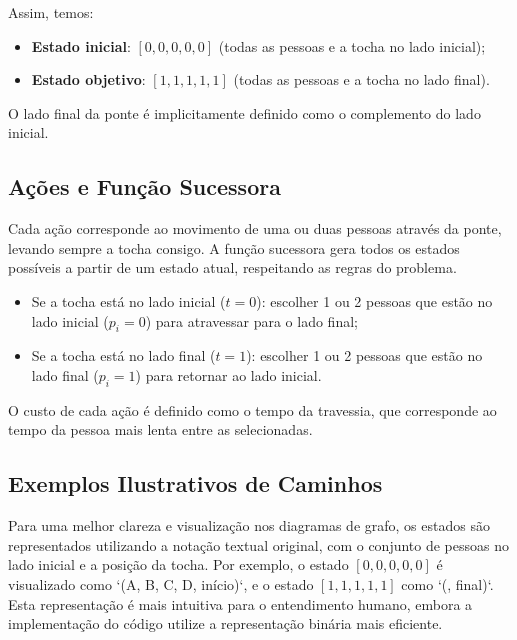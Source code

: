 \documentclass[12pt,a4paper]{article}
\begin{document}
Assim, temos:
\begin{itemize}
    \item \textbf{Estado inicial}: $[0, 0, 0, 0, 0]$ (todas as pessoas e a tocha no lado inicial);
    \item \textbf{Estado objetivo}: $[1, 1, 1, 1, 1]$ (todas as pessoas e a tocha no lado final).
\end{itemize}

O lado final da ponte é implicitamente definido como o complemento do lado inicial.

\subsection{Ações e Função Sucessora}
Cada ação corresponde ao movimento de uma ou duas pessoas através da ponte, levando sempre a tocha consigo. A função sucessora gera todos os estados possíveis a partir de um estado atual, respeitando as regras do problema.

\begin{itemize}
    \item Se a tocha está no lado inicial ($t = 0$): escolher 1 ou 2 pessoas que estão no lado inicial ($p_i = 0$) para atravessar para o lado final;
    \item Se a tocha está no lado final ($t = 1$): escolher 1 ou 2 pessoas que estão no lado final ($p_i = 1$) para retornar ao lado inicial.
\end{itemize}

O custo de cada ação é definido como o tempo da travessia, que corresponde ao tempo da pessoa mais lenta entre as selecionadas.

\subsection{Exemplos Ilustrativos de Caminhos}
Para uma melhor clareza e visualização nos diagramas de grafo, os estados são representados utilizando a notação textual original, com o conjunto de pessoas no lado inicial e a posição da tocha. Por exemplo, o estado $[0, 0, 0, 0, 0]$ é visualizado como `({A, B, C, D}, início)`, e o estado $[1, 1, 1, 1, 1]$ como `({}, final)`. Esta representação é mais intuitiva para o entendimento humano, embora a implementação do código utilize a representação binária mais eficiente.
\end{document}
